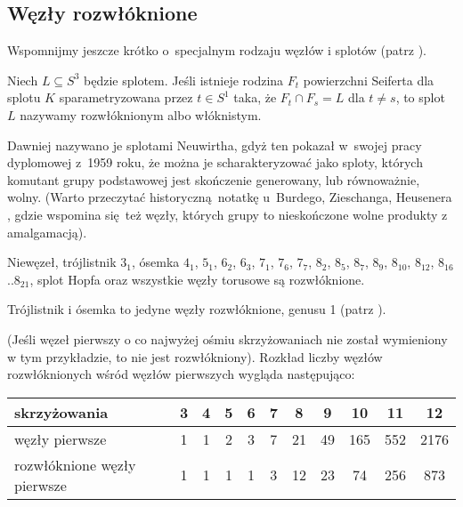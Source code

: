 
\subsection{Węzły rozwłóknione}
%
%
Wspomnijmy jeszcze krótko o~specjalnym rodzaju węzłów i splotów (patrz \cite[s. 49-50]{kawauchi1996}).

\begin{definition}
    Niech $L \subseteq S^3$ będzie splotem.
    Jeśli istnieje rodzina $F_t$ powierzchni Seiferta dla splotu $K$ sparametryzowana przez $t \in S^1$ taka, że $F_t \cap F_s = L$ dla $t \neq s$, to splot $L$ nazywamy rozwłóknionym albo włóknistym.
\end{definition}

%
Dawniej nazywano je splotami Neuwirtha, gdyż ten pokazał w~swojej pracy dyplomowej z~1959 roku, że można je scharakteryzować jako sploty, których komutant grupy podstawowej jest skończenie generowany, lub równoważnie, wolny.
(Warto przeczytać historyczną notatkę u~Burdego, Zieschanga, Heusenera \cite[s. 68]{burde2014}, gdzie wspomina się też węzły, których grupy to nieskończone wolne produkty z amalgamacją).

\begin{example}
    Niewęzeł, trójlistnik $3_1$, ósemka $4_1$, $5_{1}$, $6_{2}$, $6_{3}$, $7_{1}$, $7_{6}$, $7_{7}$, $8_{2}$, $8_{5}$, $8_{7}$, $8_{9}$, $8_{10}$, $8_{12}$, $8_{16}$..$8_{21}$, splot Hopfa oraz wszystkie węzły torusowe są rozwłóknione.

    Trójlistnik i ósemka to jedyne węzły rozwłóknione, genusu 1 (patrz \cite[s. 79]{burde2014}).
\end{example}

(Jeśli węzeł pierwszy o co najwyżej ośmiu skrzyżowaniach nie został wymieniony w tym przykładzie, to nie jest rozwłókniony).
Rozkład liczby węzłów rozwłóknionych wśród węzłów pierwszych wygląda następująco:

\renewcommand*{\arraystretch}{1.4}
\footnotesize
\begin{longtable}{lcccccccccc}
    \hline
    \textbf{skrzyżowania} & 3 & 4 & 5 & 6 & 7 & 8 & 9 & 10 &  11 &  12 \\ \hline \endhead
    węzły pierwsze & 1 & 1 & 2 & 3 & 7 & 21 & 49 & 165 & 552 & 2176 \\
    rozwłóknione węzły pierwsze & 1 & 1 & 1 & 1 & 3 & 12 & 23 & 74 & 256 & 873 \\
    \hline
\end{longtable}
\normalsize

